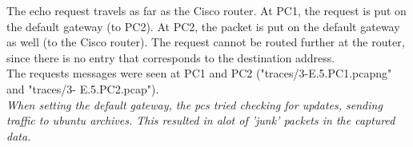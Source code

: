 The echo request travels as far as the Cisco router. At PC1, the request is put on the
default gateway (to PC2). At PC2, the packet is put on the default gateway as well (to the Cisco router). The request cannot be routed further at the router, since there is no entry
that corresponds to the destination address. \\
The requests messages were seen at PC1 and PC2 ("traces/3-E.5.PC1.pcapng" and "traces/3-
E.5.PC2.pcap"). \\
\textit{When setting the default gateway, the pcs tried checking for updates, sending traffic to ubuntu archives. This resulted in alot of 'junk' packets in the captured data.}